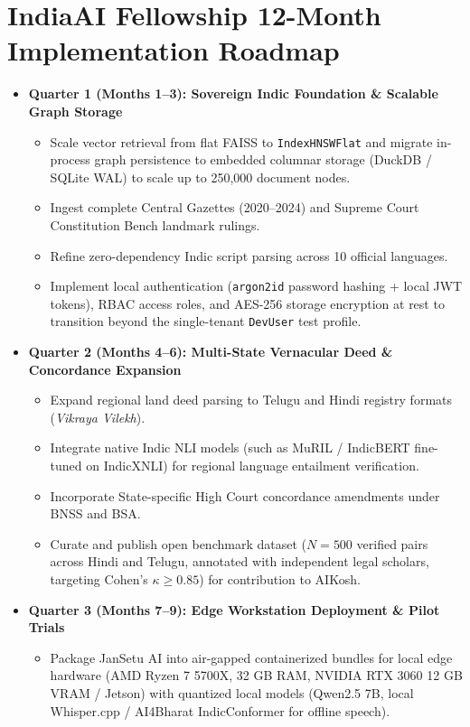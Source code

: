\documentclass[12pt,a4paper,oneside]{report}
\begin{document}
\section{IndiaAI Fellowship 12-Month Implementation Roadmap}
\begin{itemize}[itemsep=3pt]
    \item \textbf{Quarter 1 (Months 1--3): Sovereign Indic Foundation \& Scalable Graph Storage}
    \begin{itemize}[itemsep=1pt]
        \item Scale vector retrieval from flat FAISS to \texttt{IndexHNSWFlat} and migrate in-process graph persistence to embedded columnar storage (DuckDB / SQLite WAL) to scale up to 250,000 document nodes.
        \item Ingest complete Central Gazettes (2020--2024) and Supreme Court Constitution Bench landmark rulings.
        \item Refine zero-dependency Indic script parsing across 10 official languages.
        \item Implement local authentication (\texttt{argon2id} password hashing + local JWT tokens), RBAC access roles, and AES-256 storage encryption at rest to transition beyond the single-tenant \texttt{DevUser} test profile.
    \end{itemize}
    \item \textbf{Quarter 2 (Months 4--6): Multi-State Vernacular Deed \& Concordance Expansion}
    \begin{itemize}[itemsep=1pt]
        \item Expand regional land deed parsing to Telugu and Hindi registry formats (\textit{Vikraya Vilekh}).
        \item Integrate native Indic NLI models (such as MuRIL / IndicBERT fine-tuned on IndicXNLI) for regional language entailment verification.
        \item Incorporate State-specific High Court concordance amendments under BNSS and BSA.
        \item Curate and publish open benchmark dataset ($N=500$ verified pairs across Hindi and Telugu, annotated with independent legal scholars, targeting Cohen's $\kappa \ge 0.85$) for contribution to AIKosh.
    \end{itemize}
    \item \textbf{Quarter 3 (Months 7--9): Edge Workstation Deployment \& Pilot Trials}
    \begin{itemize}[itemsep=1pt]
        \item Package JanSetu AI into air-gapped containerized bundles for local edge hardware (AMD Ryzen 7 5700X, 32 GB RAM, NVIDIA RTX 3060 12 GB VRAM / Jetson) with quantized local models (Qwen2.5 7B, local Whisper.cpp / AI4Bharat IndicConformer for offline speech).

\end{itemize}
\end{itemize}
\end{document}
